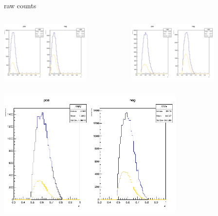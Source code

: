\begin{frame}{raw counts}
\begin{columns}
\begin{column}[T]{0.5\textwidth}
\includegraphics[width = 0.7\textwidth]{results/yield/statistics/counts_x_Q2_z_0.60_4.775_0.40.png}
\end{column}
\begin{column}[T]{0.5\textwidth}
\includegraphics[width = 0.7\textwidth]{results/yield/statistics/counts_x_Q2_z_0.60_4.775_0.50.png}
\end{column}
\end{columns}
\begin{columns}
\begin{column}[T]{0.5\textwidth}
\includegraphics[width = 0.7\textwidth]{results/yield/statistics/counts_x_Q2_z_0.60_4.775_0.60.png}

\end{column}
\end{columns}
\end{frame}
